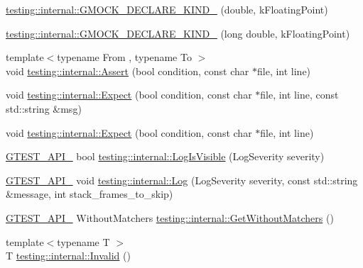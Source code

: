 \begin{DoxyCompactItemize}
\item 
\mbox{\hyperlink{namespacetesting_1_1internal_a45748f4c08b868cb4939081769cdc7b1}{testing\+::internal\+::\+G\+M\+O\+C\+K\+\_\+\+D\+E\+C\+L\+A\+R\+E\+\_\+\+K\+I\+N\+D\+\_\+}} (double, k\+Floating\+Point)
\item 
\mbox{\hyperlink{namespacetesting_1_1internal_af46fdd94d8aea0da729b554de443315f}{testing\+::internal\+::\+G\+M\+O\+C\+K\+\_\+\+D\+E\+C\+L\+A\+R\+E\+\_\+\+K\+I\+N\+D\+\_\+}} (long double, k\+Floating\+Point)
\item 
{\footnotesize template$<$typename From , typename To $>$ }\\void \mbox{\hyperlink{namespacetesting_1_1internal_a7a259643b7f2d23ce2b757728df42c99}{testing\+::internal\+::\+Assert}} (bool condition, const char $\ast$file, int line)
\item 
void \mbox{\hyperlink{namespacetesting_1_1internal_ad93379317e10862a77b9fb90aa96e083}{testing\+::internal\+::\+Expect}} (bool condition, const char $\ast$file, int line, const std\+::string \&msg)
\item 
void \mbox{\hyperlink{namespacetesting_1_1internal_a0dfe8a755bd02aa5ea162764b61a9d97}{testing\+::internal\+::\+Expect}} (bool condition, const char $\ast$file, int line)
\item 
\mbox{\hyperlink{_obj__test_2lib_2googletest-release-1_88_81_2googletest_2include_2gtest_2internal_2gtest-port_8h_aa73be6f0ba4a7456180a94904ce17790}{G\+T\+E\+S\+T\+\_\+\+A\+P\+I\+\_\+}} bool \mbox{\hyperlink{namespacetesting_1_1internal_a69ffdba5ee36743e88d8f89b79e566ff}{testing\+::internal\+::\+Log\+Is\+Visible}} (Log\+Severity severity)
\item 
\mbox{\hyperlink{_obj__test_2lib_2googletest-release-1_88_81_2googletest_2include_2gtest_2internal_2gtest-port_8h_aa73be6f0ba4a7456180a94904ce17790}{G\+T\+E\+S\+T\+\_\+\+A\+P\+I\+\_\+}} void \mbox{\hyperlink{namespacetesting_1_1internal_a8a57ce0412334a3f487bbaa8321febbe}{testing\+::internal\+::\+Log}} (Log\+Severity severity, const std\+::string \&message, int stack\+\_\+frames\+\_\+to\+\_\+skip)
\item 
\mbox{\hyperlink{_obj__test_2lib_2googletest-release-1_88_81_2googletest_2include_2gtest_2internal_2gtest-port_8h_aa73be6f0ba4a7456180a94904ce17790}{G\+T\+E\+S\+T\+\_\+\+A\+P\+I\+\_\+}} Without\+Matchers \mbox{\hyperlink{namespacetesting_1_1internal_ad4e02ea077a717f95a10a03c10272f1c}{testing\+::internal\+::\+Get\+Without\+Matchers}} ()
\item 
{\footnotesize template$<$typename T $>$ }\\T \mbox{\hyperlink{namespacetesting_1_1internal_a3316c24e8a79f5def3e85d763ae50854}{testing\+::internal\+::\+Invalid}} ()

\end{DoxyCompactItemize}

